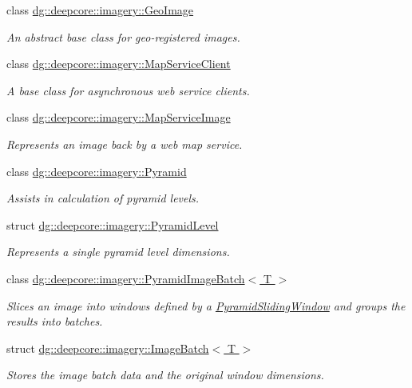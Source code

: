 \begin{DoxyCompactItemize}
class \hyperlink{classdg_1_1deepcore_1_1imagery_1_1_geo_image}{dg\+::deepcore\+::imagery\+::\+Geo\+Image}
\begin{DoxyCompactList}\small\item\em An abstract base class for geo-\/registered images. \end{DoxyCompactList}\item 
class \hyperlink{classdg_1_1deepcore_1_1imagery_1_1_map_service_client}{dg\+::deepcore\+::imagery\+::\+Map\+Service\+Client}
\begin{DoxyCompactList}\small\item\em A base class for asynchronous web service clients. \end{DoxyCompactList}\item 
class \hyperlink{classdg_1_1deepcore_1_1imagery_1_1_map_service_image}{dg\+::deepcore\+::imagery\+::\+Map\+Service\+Image}
\begin{DoxyCompactList}\small\item\em Represents an image back by a web map service. \end{DoxyCompactList}\item 
class \hyperlink{classdg_1_1deepcore_1_1imagery_1_1_pyramid}{dg\+::deepcore\+::imagery\+::\+Pyramid}
\begin{DoxyCompactList}\small\item\em Assists in calculation of pyramid levels. \end{DoxyCompactList}\item 
struct \hyperlink{structdg_1_1deepcore_1_1imagery_1_1_pyramid_level}{dg\+::deepcore\+::imagery\+::\+Pyramid\+Level}
\begin{DoxyCompactList}\small\item\em Represents a single pyramid level dimensions. \end{DoxyCompactList}\item 
class \hyperlink{classdg_1_1deepcore_1_1imagery_1_1_pyramid_image_batch}{dg\+::deepcore\+::imagery\+::\+Pyramid\+Image\+Batch$<$ T $>$}
\begin{DoxyCompactList}\small\item\em Slices an image into windows defined by a \hyperlink{classdg_1_1deepcore_1_1imagery_1_1_pyramid_sliding_window}{Pyramid\+Sliding\+Window} and groups the results into batches. \end{DoxyCompactList}\item 
struct \hyperlink{structdg_1_1deepcore_1_1imagery_1_1_image_batch}{dg\+::deepcore\+::imagery\+::\+Image\+Batch$<$ T $>$}
\begin{DoxyCompactList}\small\item\em Stores the image batch data and the original window dimensions. \end{DoxyCompactList}\item 

\end{DoxyCompactItemize}
